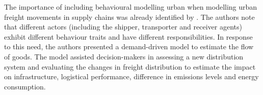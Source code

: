 




The importance of including behavioural modelling urban when modelling urban freight movements in supply chains was already identified by \citet{boerkamps2000modeling}. The authors note that different actors (including the shipper, transporter and receiver agents) exhibit different behaviour traits and have different responsibilities. In response to this need, the authors presented a demand-driven model to estimate the flow of goods. The model assisted decision-makers in assessing a new distribution system and evaluating the changes in freight distribution to estimate the impact on infrastructure, logistical performance, difference in emissions levels and energy consumption.\par


